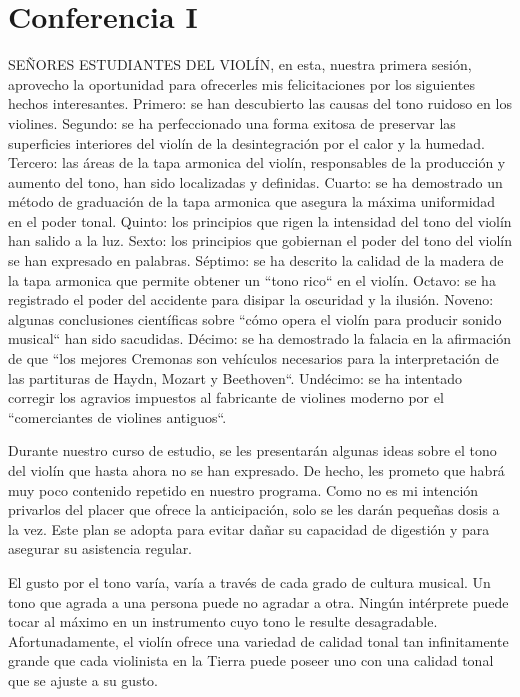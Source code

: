 \chapter*{Conferencia I}
\label{accidente}
SEÑORES ESTUDIANTES DEL VIOLÍN, en esta, nuestra primera sesión, aprovecho la oportunidad para ofrecerles mis felicitaciones por los siguientes hechos interesantes. Primero: se han descubierto las causas del tono ruidoso en los violines. Segundo: se ha perfeccionado una forma exitosa de preservar las superficies interiores del violín de la desintegración por el calor y la humedad. Tercero: las áreas de la tapa armonica del violín, responsables de la producción y aumento del tono, han sido localizadas y definidas. Cuarto: se ha demostrado un método de graduación de la tapa armonica que asegura la máxima uniformidad en el poder tonal. Quinto: los principios que rigen la intensidad del tono del violín han salido a la luz. Sexto: los principios que gobiernan el poder del tono del violín se han expresado en palabras. Séptimo: se ha descrito la calidad de la madera de la tapa armonica que permite obtener un ``tono rico`` en el violín. Octavo: se ha registrado el poder del accidente para disipar la oscuridad y la ilusión. Noveno: algunas conclusiones científicas sobre ``cómo opera el violín para producir sonido musical`` han sido sacudidas. Décimo: se ha demostrado la falacia en la afirmación de que ``los mejores Cremonas son vehículos necesarios para la interpretación de las partituras de Haydn, Mozart y Beethoven``. Undécimo: se ha intentado corregir los agravios impuestos al fabricante de violines moderno por el ``comerciantes de violines antiguos``.

Durante nuestro curso de estudio, se les presentarán algunas ideas sobre el tono del violín que hasta ahora no se han expresado. De hecho, les prometo que habrá muy poco contenido repetido en nuestro programa. Como no es mi intención privarlos del placer que ofrece la anticipación, solo se les darán pequeñas dosis a la vez. Este plan se adopta para evitar dañar su capacidad de digestión y para asegurar su asistencia regular.

El gusto por el tono varía, varía a través de cada grado de cultura musical. Un tono que agrada a una persona puede no agradar a otra. Ningún intérprete puede tocar al máximo en un instrumento cuyo tono le resulte desagradable. Afortunadamente, el violín ofrece una variedad de calidad tonal tan infinitamente grande que cada violinista en la Tierra puede poseer uno con una calidad tonal que se ajuste a su gusto.

